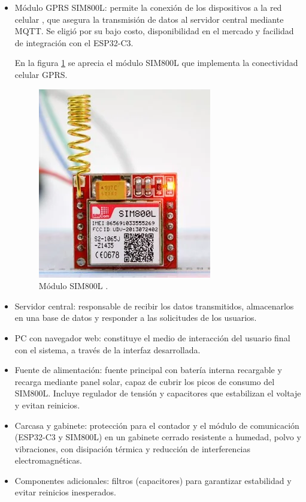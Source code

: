 \begin{itemize}

\item Módulo GPRS SIM800L: permite la conexión de los dispositivos a la red celular \cite{sim800l_datasheet}, que asegura la transmisión de datos al servidor central mediante MQTT. Se eligió por su bajo costo, disponibilidad en el mercado y facilidad de integración con el ESP32-C3.

En la figura \ref{fig:foto_sim800l} se aprecia el módulo SIM800L que implementa la conectividad celular GPRS.

\begin{figure}[H]
  \centering
  \includegraphics[width=0.4\linewidth]{./Figures/fotoSim800l.png}
  \caption{Módulo SIM800L \protect\footnotemark.}
  \label{fig:foto_sim800l}
\end{figure}


\item Servidor central: responsable de recibir los datos transmitidos, almacenarlos en una base de datos y responder a las solicitudes de los usuarios.

\item PC con navegador web: constituye el medio de interacción del usuario final con el sistema, a través de la interfaz desarrollada.

\item Fuente de alimentación: fuente principal con batería interna recargable y recarga mediante panel solar, capaz de cubrir los picos de consumo del SIM800L. Incluye regulador de tensión y capacitores que estabilizan el voltaje y evitan reinicios.

\item Carcasa y gabinete: protección para el contador y el módulo de comunicación (ESP32-C3 y SIM800L) en un gabinete cerrado resistente a humedad, polvo y vibraciones, con disipación térmica y reducción de interferencias electromagnéticas.

\item Componentes adicionales: filtros (capacitores) para garantizar estabilidad y evitar reinicios inesperados.


\end{itemize}



